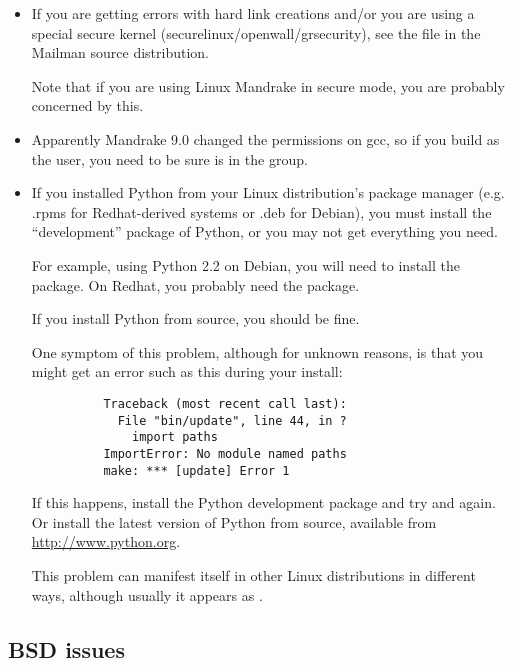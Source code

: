 \documentclass{howto}
\begin{document}
\begin{itemize}
\item If you are getting errors with hard link creations and/or you are using
      a special secure kernel (securelinux/openwall/grsecurity), see the file
       in the Mailman source
      distribution.

      Note that if you are using Linux Mandrake in secure mode, you are
      probably concerned by this.

\item Apparently Mandrake 9.0 changed the permissions on gcc, so if you build
      as the  user, you need to be sure  is in the
       group.

\item If you installed Python from your Linux distribution's package manager
      (e.g. .rpms for Redhat-derived systems or .deb for Debian), you must
      install the ``development'' package of Python, or you may not get
      everything you need.

      For example, using Python 2.2 on Debian, you will need to install the
       package.  On Redhat, you probably need the
       package.

      If you install Python from source, you should be fine.

      One symptom of this problem, although for unknown reasons, is that you
      might get an error such as this during your install:

      \begin{verbatim}
          Traceback (most recent call last):
            File "bin/update", line 44, in ?
              import paths
          ImportError: No module named paths
          make: *** [update] Error 1
      \end{verbatim}

      If this happens, install the Python development package and try
       and  again.  Or install the
      latest version of Python from source, available from
      \url{http://www.python.org}.

      This problem can manifest itself in other Linux distributions in
      different ways, although usually it appears as .
\end{itemize}

\subsection{BSD issues\label{bsd-issues}}
\end{document}
